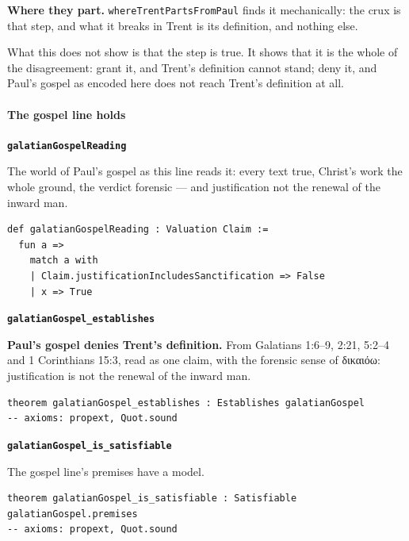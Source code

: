 \documentclass[11pt]{article}
\begin{document}
\textbf{Where they part.} \texttt{where\allowbreak{}Trent\allowbreak{}Parts\allowbreak{}From\allowbreak{}Paul} finds it mechanically: the crux is that step, and what it breaks in Trent is its definition, and nothing else.

What this does not show is that the step is true. It shows that it is the whole of the disagreement: grant it, and Trent's definition cannot stand; deny it, and Paul's gospel as encoded here does not reach Trent's definition at all.

\paragraph*{The gospel line holds}
\leavevmode\par
\par\medskip\noindent\textbf{\texttt{galatian\allowbreak{}Gospel\allowbreak{}Reading}}\par\nobreak\noindent
The world of Paul's gospel as this line reads it: every text true, Christ's work the whole ground, the verdict forensic — and justification not the renewal of the inward man.

{\small\begin{verbatim}
def galatianGospelReading : Valuation Claim :=
  fun a =>
    match a with
    | Claim.justificationIncludesSanctification => False
    | x => True
\end{verbatim}}
\par\medskip\noindent\textbf{\texttt{galatian\allowbreak{}Gospel\_\allowbreak{}establishes}}\par\nobreak\noindent
\textbf{Paul's gospel denies Trent's definition.} From Galatians 1:6–9, 2:21, 5:2–4 and 1 Corinthians 15:3, read as one claim, with the forensic sense of δικαιόω: justification is not the renewal of the inward man.

{\small\begin{verbatim}
theorem galatianGospel_establishes : Establishes galatianGospel
-- axioms: propext, Quot.sound
\end{verbatim}}
\par\medskip\noindent\textbf{\texttt{galatian\allowbreak{}Gospel\_\allowbreak{}is\_\allowbreak{}satisfiable}}\par\nobreak\noindent
The gospel line's premises have a model.

{\small\begin{verbatim}
theorem galatianGospel_is_satisfiable : Satisfiable galatianGospel.premises
-- axioms: propext, Quot.sound
\end{verbatim}}
\end{document}
